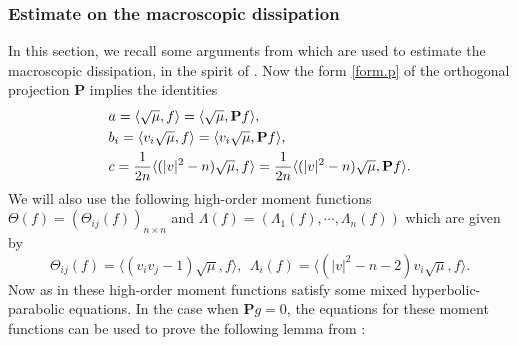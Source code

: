 \documentclass{amsart}
\numberwithin{equation}{section}
\begin{document}
\subsubsection{Estimate on the macroscopic dissipation}\label{macro.diss.d}
In this section, we recall some arguments from \cite{D-Hypo} which are used to estimate the macroscopic dissipation, in the spirit of \cite{MR1057534}.   Now the form \eqref{form.p} of the orthogonal projection ${\mathbf{P}}$ implies the identities
\begin{equation}
\label{coef.p.def}
\begin{split}
  {\displaystyle}   & a= \langle {\sqrt{\mu}}, {f}\rangle= \langle {\sqrt{\mu}}, {\mathbf{P}} {f}\rangle,
  \\
  {\displaystyle}  & b_i=\langle {v}_i {\sqrt{\mu}}, {f}\rangle
=\langle {v}_i {\sqrt{\mu}},{\mathbf{P}} {f}\rangle,
\\
  {\displaystyle} & c= \frac{1}{2{n}}\langle (|{v}|^2-{n}) {\sqrt{\mu}}, {f}\rangle
= \frac{1}{2{n}}\langle (|{v}|^2-{n}) {\sqrt{\mu}}, {\mathbf{P}} {f}\rangle.
    \end{split}
\end{equation}
We will also use the following high-order moment functions ${\Theta}({f})=({\Theta}_{ij}({f}))_{{n}\times {n}}$ and 
${\Lambda}({f})=({\Lambda}_1({f}),\cdots,{\Lambda}_{n}({f}))$ which are given by
\begin{equation}
  {\Theta}_{ij}({f}) = \langle({v}_i{v}_j-1){\sqrt{\mu}}, {f}\rangle,\ \
  {\Lambda}_i({f})=\langle(|{v}|^2-{n} - 2){v}_i{\sqrt{\mu}},
  {f}\rangle.\label{def.gala}
\end{equation}
Now as in \cite{D-Hypo} these high-order moment functions satisfy some mixed hyperbolic-parabolic equations.  In the case when ${\mathbf{P}} g=0$, the equations for these moment functions can be used to prove the following lemma from \cite[Lemma 4.1]{D-Hypo}:
\end{document}
